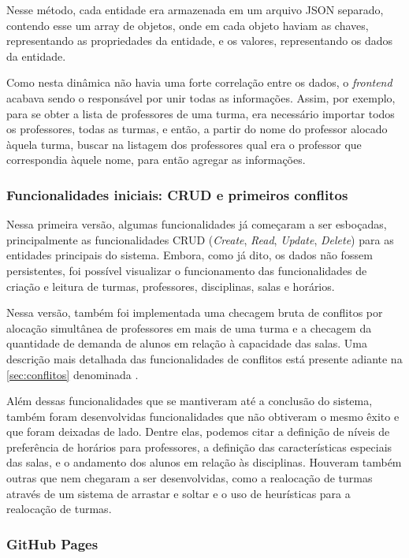 Nesse método, cada entidade era armazenada em um arquivo JSON separado, contendo esse um array de objetos, onde em cada objeto haviam as chaves, representando as propriedades da entidade, e os valores, representando os dados da entidade.

Como nesta dinâmica não havia uma forte correlação entre os dados, o \textit{frontend} acabava sendo o responsável por unir todas as informações. Assim, por exemplo, para se obter a lista de professores de uma turma, era necessário importar todos os professores, todas as turmas, e então, a partir do nome do professor alocado àquela turma, buscar na listagem dos professores qual era o professor que correspondia àquele nome, para então agregar as informações.

\subsubsection*{Funcionalidades iniciais: CRUD e primeiros conflitos} \label{sssec:Funcionalidades Iniciais}

Nessa primeira versão, algumas funcionalidades já começaram a ser esboçadas, principalmente as funcionalidades CRUD (\textit{Create}, \textit{Read}, \textit{Update}, \textit{Delete}) para as entidades principais do sistema. Embora, como já dito, os dados não fossem persistentes, foi possível visualizar o funcionamento das funcionalidades de criação e leitura de turmas, professores, disciplinas, salas e horários.

Nessa versão, também foi implementada uma checagem bruta de conflitos por alocação simultânea de professores em mais de uma turma e a checagem da quantidade de demanda de alunos em relação à capacidade das salas. Uma descrição mais detalhada das funcionalidades de conflitos está presente adiante na \autoref{sec:conflitos} denominada .

Além dessas funcionalidades que se mantiveram até a conclusão do sistema, também foram desenvolvidas funcionalidades que não obtiveram o mesmo êxito e que foram deixadas de lado. Dentre elas, podemos citar a definição de níveis de preferência de horários para professores, a definição das características especiais das salas, e o andamento dos alunos em relação às disciplinas. Houveram também outras que nem chegaram a ser desenvolvidas, como a realocação de turmas através de um sistema de arrastar e soltar e o uso de heurísticas para a realocação de turmas.

\subsubsection*{GitHub Pages} \label{sssec:GitHub Pages}

